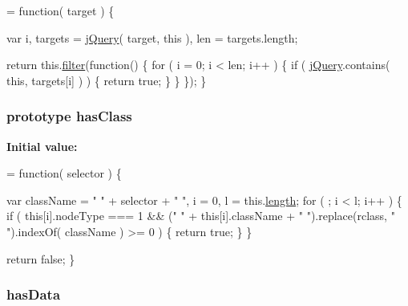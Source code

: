 \begin{DoxyCode}
= \textcolor{keyword}{function}( target ) \{


        var i,
            targets = \hyperlink{jquery-1_810_82-vsdoc_8js_add5237586d970a38a81f990e8eb28c6c}{jQuery}( target, \textcolor{keyword}{this} ),
            len = targets.length;

        \textcolor{keywordflow}{return} this.\hyperlink{jquery-1_810_82-vsdoc_8js_ac99d0cf56cab46114f5765a14e03ad6d}{filter}(\textcolor{keyword}{function}() \{
            \textcolor{keywordflow}{for} ( i = 0; i < len; i++ ) \{
                \textcolor{keywordflow}{if} ( \hyperlink{jquery-1_810_82-vsdoc_8js_add5237586d970a38a81f990e8eb28c6c}{jQuery}.contains( \textcolor{keyword}{this}, targets[i] ) ) \{
                    \textcolor{keywordflow}{return} \textcolor{keyword}{true};
                \}
            \}
        \});
    \}
\end{DoxyCode}
\hypertarget{jquery-1_810_82-vsdoc_8js_a8a4b3bae3851e6836fad6374ebac2bfe}{
\subsubsection[{has\-Class}]{ {\bf prototype} has\-Class}}\label{jquery-1_810_82-vsdoc_8js_a8a4b3bae3851e6836fad6374ebac2bfe}
{\bfseries Initial value\-:}
\begin{DoxyCode}
= \textcolor{keyword}{function}( selector ) \{


        var className = \textcolor{stringliteral}{" "} + selector + \textcolor{stringliteral}{" "},
            i = 0,
            l = this.\hyperlink{jquery-1_810_82-vsdoc_8js_aa7de35d58da66d9944ab9cbe82c19640}{length};
        \textcolor{keywordflow}{for} ( ; i < l; i++ ) \{
            \textcolor{keywordflow}{if} ( \textcolor{keyword}{this}[i].nodeType === 1 && (\textcolor{stringliteral}{" "} + \textcolor{keyword}{this}[i].className + \textcolor{stringliteral}{" "}).replace(rclass, \textcolor{stringliteral}{" "}).indexOf( 
      className ) >= 0 ) \{
                \textcolor{keywordflow}{return} \textcolor{keyword}{true};
            \}
        \}

        \textcolor{keywordflow}{return} \textcolor{keyword}{false};
    \}
\end{DoxyCode}
\hypertarget{jquery-1_810_82-vsdoc_8js_ae295a27c2f07b73f73ec6e43b4a0eb88}{
\subsubsection[{has\-Data}]{ has\-Data}}\label{jquery-1_810_82-vsdoc_8js_ae295a27c2f07b73f73ec6e43b4a0eb88}
